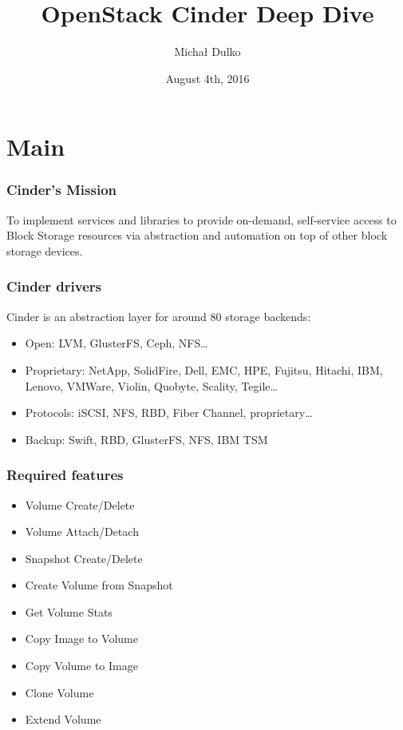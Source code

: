 \documentclass[aspectratio=169]{beamer}
\title{OpenStack Cinder Deep Dive}
\author{Michał Dulko}
\date{August 4th, 2016}
\begin{document}
\begin{frame}
\titlepage
\end{frame}

\section{Main}

\begin{frame}
\frametitle{Cinder's Mission}
\pause
\begin{center}
    \huge To implement services and libraries to provide on-demand, self-service
    access to Block Storage resources via abstraction and automation on top of
    other block storage devices.
\end{center}

\end{frame}

\begin{frame}
    \frametitle{Cinder drivers}
    Cinder is an abstraction layer for around 80 storage backends:
    \begin{itemize}
        \item Open: LVM, GlusterFS, Ceph, NFS…
        \item Proprietary: NetApp, SolidFire, Dell, EMC, HPE, Fujitsu, Hitachi, IBM, Lenovo, VMWare, Violin, Quobyte, Scality, Tegile…
        \item Protocols: iSCSI, NFS, RBD, Fiber Channel, proprietary…
        \item Backup: Swift, RBD, GlusterFS, NFS, IBM TSM
    \end{itemize}
\end{frame}

\begin{frame}
    \frametitle{Required features}
    \begin{itemize}
        \item Volume Create/Delete
        \item Volume Attach/Detach
        \item Snapshot Create/Delete
        \item Create Volume from Snapshot
        \item Get Volume Stats
        \item Copy Image to Volume
        \item Copy Volume to Image
        \item Clone Volume
        \item Extend Volume
    \end{itemize}
\end{frame}
\end{document}

